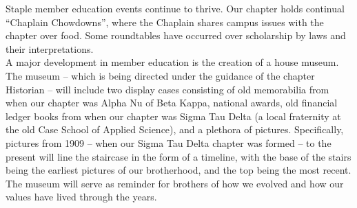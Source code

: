       Staple member education events continue to thrive. Our chapter holds continual ``Chaplain Chowdowns'', where the Chaplain shares campus issues with the chapter over food. Some roundtables have occurred over scholarship by laws and their interpretations. \\
      
      A major development in member education is the creation of a house museum. The museum – which is being directed under the guidance of the chapter Historian – will include two display cases consisting of old memorabilia from when our chapter was Alpha Nu of Beta Kappa, national awards, old financial ledger books from when our chapter was Sigma Tau Delta (a local fraternity at the old Case School of Applied Science), and a plethora of pictures. Specifically, pictures from 1909 – when our Sigma Tau Delta chapter was formed – to the present will line the staircase in the form of a timeline, with the base of the stairs being the earliest pictures of our brotherhood, and the top being the most recent. The museum will serve as reminder for brothers of how we evolved and how our values have lived through the years. 